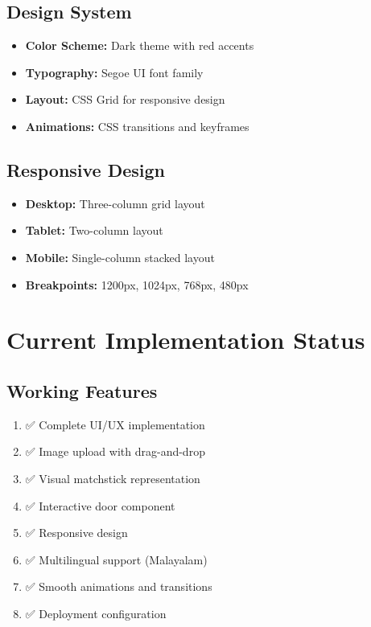 \documentclass[12pt,a4paper]{article}
\begin{document}
\subsection{Design System}
\begin{itemize}
    \item \textbf{Color Scheme:} Dark theme with red accents
    \item \textbf{Typography:} Segoe UI font family
    \item \textbf{Layout:} CSS Grid for responsive design
    \item \textbf{Animations:} CSS transitions and keyframes
\end{itemize}

\subsection{Responsive Design}
\begin{itemize}
    \item \textbf{Desktop:} Three-column grid layout
    \item \textbf{Tablet:} Two-column layout
    \item \textbf{Mobile:} Single-column stacked layout
    \item \textbf{Breakpoints:} 1200px, 1024px, 768px, 480px
\end{itemize}

\section{Current Implementation Status}

\subsection{Working Features}
\begin{enumerate}
    \item ✅ Complete UI/UX implementation
    \item ✅ Image upload with drag-and-drop
    \item ✅ Visual matchstick representation
    \item ✅ Interactive door component
    \item ✅ Responsive design
    \item ✅ Multilingual support (Malayalam)
    \item ✅ Smooth animations and transitions
    \item ✅ Deployment configuration
\end{enumerate}
\end{document}
